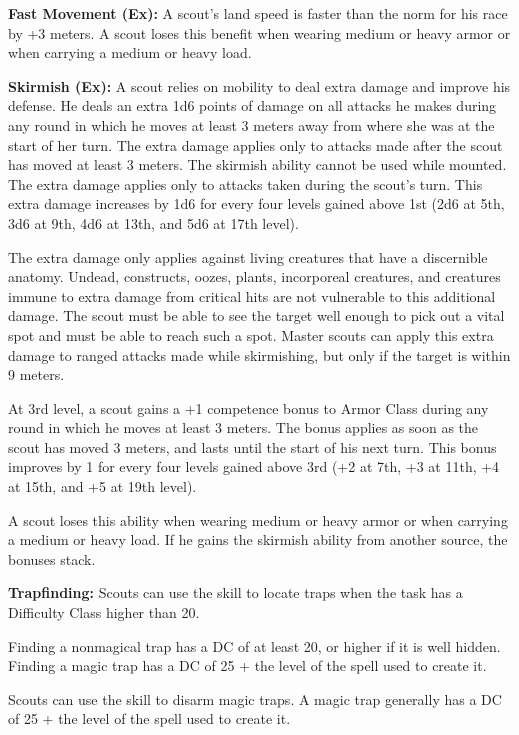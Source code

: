 \textbf{Fast Movement (Ex):} A scout's land speed is faster than the norm for his race by +3 meters. A scout loses this benefit when wearing medium or heavy armor or when carrying a medium or heavy load.


\textbf{Skirmish (Ex):} A scout relies on mobility to deal extra damage and improve his defense. He deals an extra 1d6 points of damage on all attacks he makes during any round in which he moves at least 3 meters away from where she was at the start of her turn. The extra damage applies only to attacks made after the scout has moved at least 3 meters. The skirmish ability cannot be used while mounted. The extra damage applies only to attacks taken during the scout's turn. This extra damage increases by 1d6 for every four levels gained above 1st (2d6 at 5th, 3d6 at 9th, 4d6 at 13th, and 5d6 at 17th level).

The extra damage only applies against living creatures that have a discernible anatomy. Undead, constructs, oozes, plants, incorporeal creatures, and creatures immune to extra damage from critical hits are not vulnerable to this additional damage. The scout must be able to see the target well enough to pick out a vital spot and must be able to reach such a spot. Master scouts can apply this extra damage to ranged attacks made while skirmishing, but only if the target is within 9 meters.

At 3rd level, a scout gains a +1 competence bonus to Armor Class during any round in which he moves at least 3 meters. The bonus applies as soon as the scout has moved 3 meters, and lasts until the start of his next turn. This bonus improves by 1 for every four levels gained above 3rd (+2 at 7th, +3 at 11th, +4 at 15th, and +5 at 19th level).

A scout loses this ability when wearing medium or heavy armor or when carrying a medium or heavy load. If he gains the skirmish ability from another source, the bonuses stack.


\textbf{Trapfinding:} Scouts can use the  skill to locate traps when the task has a Difficulty Class higher than 20.

Finding a nonmagical trap has a DC of at least 20, or higher if it is well hidden. Finding a magic trap has a DC of 25 + the level of the spell used to create it.

Scouts can use the  skill to disarm magic traps. A magic trap generally has a DC of 25 + the level of the spell used to create it.

